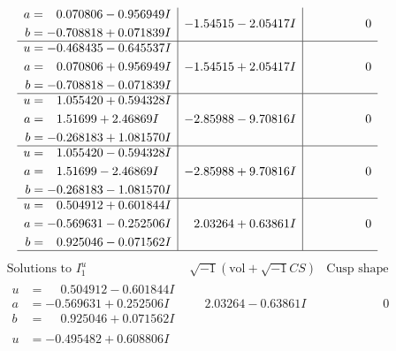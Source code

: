 \documentclass[1p]{elsarticle_modified}
\theoremstyle{definition}
\newcommand{\I}{\sqrt{-1}}
\begin{document}
$$\begin{array}{c|c|c}
\begin{aligned}
a &= \phantom{-}0.070806 - 0.956949 I \\
b &= -0.708818 + 0.071839 I\end{aligned}
 & -1.54515 - 2.05417 I & \phantom{-0.000000 } 0 \\ \hline\begin{aligned}
u &= -0.468435 - 0.645537 I \\
a &= \phantom{-}0.070806 + 0.956949 I \\
b &= -0.708818 - 0.071839 I\end{aligned}
 & -1.54515 + 2.05417 I & \phantom{-0.000000 } 0 \\ \hline\begin{aligned}
u &= \phantom{-}1.055420 + 0.594328 I \\
a &= \phantom{-}1.51699 + 2.46869 I \\
b &= -0.268183 + 1.081570 I\end{aligned}
 & -2.85988 - 9.70816 I & \phantom{-0.000000 } 0 \\ \hline\begin{aligned}
u &= \phantom{-}1.055420 - 0.594328 I \\
a &= \phantom{-}1.51699 - 2.46869 I \\
b &= -0.268183 - 1.081570 I\end{aligned}
 & -2.85988 + 9.70816 I & \phantom{-0.000000 } 0 \\ \hline\begin{aligned}
u &= \phantom{-}0.504912 + 0.601844 I \\
a &= -0.569631 - 0.252506 I \\
b &= \phantom{-}0.925046 - 0.071562 I\end{aligned}
 & \phantom{-}2.03264 + 0.63861 I & \phantom{-0.000000 } 0\\
 \hline 
 \end{array}$$\newpage$$\begin{array}{c|c|c}  
\text{Solutions to }I^u_{1}& \I (\text{vol} + \sqrt{-1}CS) & \text{Cusp shape}\\
 \hline 
\begin{aligned}
u &= \phantom{-}0.504912 - 0.601844 I \\
a &= -0.569631 + 0.252506 I \\
b &= \phantom{-}0.925046 + 0.071562 I\end{aligned}
 & \phantom{-}2.03264 - 0.63861 I & \phantom{-0.000000 } 0 \\ \hline\begin{aligned}
u &= -0.495482 + 0.608806 I \\

\end{aligned}
\end{array}$$
\end{document}
